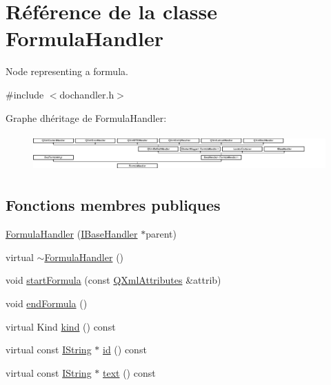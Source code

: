 \hypertarget{class_formula_handler}{}\section{Référence de la classe Formula\+Handler}
\label{class_formula_handler}


Node representing a formula.  




{\ttfamily \#include $<$dochandler.\+h$>$}

Graphe d\textquotesingle{}héritage de Formula\+Handler\+:\begin{figure}[H]
\begin{center}
\leavevmode
\includegraphics[height=1.434978cm]{class_formula_handler}
\end{center}
\end{figure}
\subsection*{Fonctions membres publiques}
\begin{DoxyCompactItemize}
\item 
\hyperlink{class_formula_handler_aeed3112a4426209d365fe302355f41b8}{Formula\+Handler} (\hyperlink{class_i_base_handler}{I\+Base\+Handler} $\ast$parent)
\item 
virtual \hyperlink{class_formula_handler_aa7b0ce2a376b37b60bff708fb2fea022}{$\sim$\+Formula\+Handler} ()
\item 
void \hyperlink{class_formula_handler_ab8ab33296c90303b9c5b385d6e59d6cf}{start\+Formula} (const \hyperlink{class_q_xml_attributes}{Q\+Xml\+Attributes} \&attrib)
\item 
void \hyperlink{class_formula_handler_a7f738ffb7f704d3a13a5f6d4e1a2a6be}{end\+Formula} ()
\item 
virtual Kind \hyperlink{class_formula_handler_ac2484b666e31f0322de5fbfb315beb3c}{kind} () const 
\item 
virtual const \hyperlink{class_i_string}{I\+String} $\ast$ \hyperlink{class_formula_handler_ab3a8d73cfd2bc63dc9cdb20ff055a0ed}{id} () const 
\item 
virtual const \hyperlink{class_i_string}{I\+String} $\ast$ \hyperlink{class_formula_handler_a70a77132e0e0d96c14037fc8e64abee0}{text} () const 
\end{DoxyCompactItemize}
